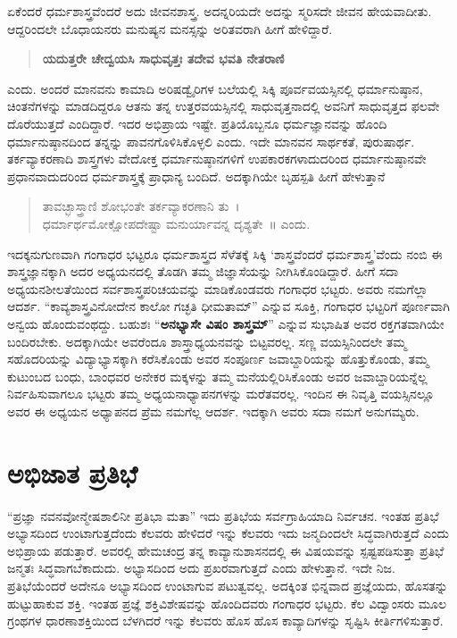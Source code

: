 {ಏಕೆಂದರೆ ಧರ್ಮಶಾಸ್ತ್ರವೆಂದರೆ ಅದು ಜೀವನಶಾಸ್ತ್ರ. ಅದನ್ನರಿಯದೇ ಅದನ್ನು ಸ್ಮರಿಸದೇ ಜೀವನ ಹೇಯವಾದೀತು. ಆದ್ದರಿಂದಲೇ ಬೊಧಾಯನರು ಮನುಷ್ಯನ ಮನಸ್ಸನ್ನು ಅರಿತವರಾಗಿ ಹೀಗೆ ಹೇಳಿದ್ದಾರೆ.
\begin{verse}
\textbf{ಯದುತ್ತರೇ ಚೇದ್ವಯಸಿ ಸಾಧುವೃತ್ತಃ ತದೇವ ಭವತಿ ನೇತರಾಣಿ}
\end{verse}
 ಎಂದು. ಅಂದರೆ ಮಾನವನು ಕಾಮಾದಿ ಅರಿಷಡ್ವೈರಿಗಳ ಬಲೆಯಲ್ಲಿ ಸಿಕ್ಕಿ ಪೂರ್ವ\-ವಯಸ್ಸಿ\-ನಲ್ಲಿ ಧರ್ಮಾನುಷ್ಠಾನ, ಚಿಂತನೆಗಳನ್ನು ಮಾಡದಿದ್ದರೂ ಆತನು ತನ್ನ ಉತ್ತರ\-ವಯಸ್ಸಿನಲ್ಲಿ ಸಾಧುವೃತ್ತನಾದಲ್ಲಿ ಅವನಿಗೆ ಸಾಧುವೃತ್ತದ ಫಲವೇ ದೊರೆಯುತ್ತದೆ ಎಂದಿದ್ದಾರೆ. ಇದರ ಅಭಿಪ್ರಾಯ ಇಷ್ಟೇ. ಪ್ರತಿಯೊಬ್ಬನೂ ಧರ್ಮಜ್ಞಾನವನ್ನು ಹೊಂದಿ ಧರ್ಮಾನುಷ್ಠಾನದಿಂದ ತನ್ನನ್ನು ಪಾವನಗೊಳಿಸಿಕೊಳ್ಳಲಿ ಎಂದು. ಇದೇ ಮಾನವನ ಸಾರ್ಥಕತೆ, ಪುರುಷಾರ್ಥ. ತರ್ಕವ್ಯಾಕರಣಾದಿ ಶಾಸ್ತ್ರಗಳು ವೇದೋಕ್ತ ಧರ್ಮಾನುಷ್ಠಾನಗಳಿಗೆ ಉಪಕಾರಕಗಳಾದುದರಿಂದ ಧರ್ಮಾನುಷ್ಠಾನವೇ ಪ್ರಧಾನವಾದುದರಿಂದ ಧರ್ಮಶಾಸ್ತ್ರಕ್ಕೆ ಪ್ರಾಧಾನ್ಯ ಬಂದಿದೆ. ಅದಕ್ಕಾಗಿಯೇ ಬೃಹಸ್ಪತಿ ಹೀಗೆ ಹೇಳುತ್ತಾನೆ  \enginline{-}  
\begin{verse}
ತಾವಚ್ಛಾಸ್ತ್ರಾಣಿ ಶೋಭಂತೇ ತರ್ಕವ್ಯಾಕರಣಾನಿ ತು~।\\
ಧರ್ಮಾರ್ಥಮೋಕ್ಷೋಪದೇಷ್ಟಾ ಮನುರ್ಯಾವನ್ನ ದೃಶ್ಯತೇ~॥ ಎಂದು.
\end{verse}
ಇದಕ್ಕನುಗುಣವಾಗಿ ಗಂಗಾಧರ ಭಟ್ಟರೂ ಧರ್ಮಶಾಸ್ತ್ರದ ಸೆಳೆತಕ್ಕೆ ಸಿಕ್ಕಿ ‘ಶಾಸ್ತ್ರವೆಂದರೆ ಧರ್ಮಶಾಸ್ತ್ರ’ವೆಂದು ನಂಬಿ ಈ ಶಾಸ್ತ್ರಜ್ಞಾನಕ್ಕಾಗಿ ಅದರ ಅಧ್ಯಯನದಲ್ಲಿ ತೊಡಗಿ ತಮ್ಮ ಜಿಜ್ಞಾಸೆಯನ್ನು ನೀಗಿಸಿಕೊಂಡಿದ್ದಾರೆ. ಹೀಗೆ ಸದಾ ಅಧ್ಯಯನಶೀಲತೆಯಿಂದ ಸರ್ವಶಾಸ್ತ್ರಪರಿಚಯವನ್ನು ಮಾಡಿಕೊಂಡವರು ಗಂಗಾಧರ ಭಟ್ಟರು. ಅವರು ನಮಗೆಲ್ಲಾ ಆದರ್ಶ. “ಕಾವ್ಯಶಾಸ್ತ್ರವಿನೋದೇನ ಕಾಲೋ ಗಚ್ಛತಿ ಧೀಮತಾಮ್” ಎನ್ನುವ ಸೂಕ್ತಿ, ಗಂಗಾಧರ ಭಟ್ಟರಿಗೆ ಪೂರ್ಣವಾಗಿ ಅನ್ವಯ ಹೊಂದುವಂಥದ್ದು. ಬಹುಶಃ “\textbf{ಅನಭ್ಯಾಸೇ ವಿಷಂ ಶಾಸ್ತ್ರಮ್}” ಎನ್ನುವ ಸುಭಾಷಿತ ಅವರ ರಕ್ತಗತವಾಗಿಯೇ ಬಂದಿರಬೇಕು. ಅದಕ್ಕಾಗಿಯೇ ಅವರೆಂದೂ ಶಾಸ್ತ್ರಾಧ್ಯಯನವನ್ನು ಬಿಟ್ಟವರಲ್ಲ. ಸಣ್ಣ ವಯಸ್ಸಿನಿಂದಲೇ ತಮ್ಮ ಸಹೊದರಿಯನ್ನು ವಿದ್ಯಾಭ್ಯಾಸಕ್ಕಾಗಿ ಕರೆಸಿಕೊಂಡು ಅವರ ಸಂಪೂರ್ಣ ಜವಾಬ್ದಾರಿಯನ್ನು ಹೊತ್ತುಕೊಂಡು, ತಮ್ಮ ಕುಟುಂಬದ ಬಂಧು, ಬಾಂಧವರ ಅನೇಕರ ಮಕ್ಕಳನ್ನು ತಮ್ಮ ಮನೆಯಲ್ಲಿರಿಸಿಕೊಂಡು ಅವರ ಜವಾಬ್ದಾರಿಯನ್ನೆಲ್ಲ ನಿರ್ವಹಿಸುವಾಗಲೂ ಭಟ್ಟರು ತಮ್ಮ ಅಧ್ಯಯನಾಧ್ಯಾಪನಗಳನ್ನು ಮರೆತವರಲ್ಲ. ಇಂದಿನ ಈ ನಿವೃತ್ತಿ ವಯಸ್ಸಿ\-ನಲ್ಲೂ ಅವರ ಈ ಅಧ್ಯಯನ ಅಧ್ಯಾಪನದ ಪ್ರೆಮ ನಮಗೆಲ್ಲ ಆದರ್ಶ. ಇದಕ್ಕಾಗಿ ಅವರು ಸದಾ ನಮಗೆ ಅನುಗಮ್ಯರು.

\section*{ಅಭಿಜಾತ ಪ್ರತಿಭೆ}  

“ಪ್ರಜ್ಞಾ ನವನವೋನ್ಮೇಷಶಾಲಿನೀ ಪ್ರತಿಭಾ ಮತಾ” ಇದು ಪ್ರತಿಭೆಯ ಸರ್ವಗ್ರಾಹಿಯಾದಿ ನಿರ್ವಚನ. ಇಂತಹ ಪ್ರತಿಭೆ ಅಭ್ಯಾಸದಿಂದ ಉಂಟಾಗುತ್ತದೆಂದು ಕೆಲವರು ಹೇಳಿದರೆ ಇನ್ನು ಕೆಲವರು ಇದು ಜನ್ಮದಿಂದಲೇ ಸಿದ್ಧವಾಗಿರುತ್ತದೆ ಎಂದು ಅಭಿಪ್ರಾಯ ಪಡುತ್ತಾರೆ. ಅವರಲ್ಲಿ ಹೇಮಚಂದ್ರ ತನ್ನ ಕಾವ್ಯಾನುಶಾಸನದಲ್ಲಿ ಈ ವಿಷಯವನ್ನು ಸ್ಪಷ್ಟಪಡಿಸುತ್ತಾ ಪ್ರತಿಭೆ ಜನ್ಮತಃ ಸಿದ್ಧವಾಗಬೆಕಾದುದು. ಅಭ್ಯಾಸದಿಂದ ಅದು ಪ್ರಖರ\-ವಾಗುತ್ತದೆ ಎಂದು ಹೇಳುತ್ತಾನೆ. ಇದೇ ನಿಜ. ಪ್ರತಿಭೆಯೆಂದರೆ ಅದೇನೂ ಅಭ್ಯಾಸದಿಂದ ಉಂಟಾಗುವ ಪಟುತ್ವವಲ್ಲ. ಅದಕ್ಕಿಂತ ಭಿನ್ನವಾದ ಪ್ರಜ್ಞೆಯದು, ಹೊಸತನ್ನು ಹುಟ್ಟು\-ಹಾಕುವ ಶಕ್ತಿ. ಇಂತಹ ಪ್ರಜ್ಞೆ ಶಕ್ತಿವಿಶೇಷವನ್ನು ಹೊಂದಿದವರು ಗಂಗಾಧರ ಭಟ್ಟರು. ಕೆಲ ವಿದ್ವಾಂಸರು ಮೂಲ ಗ್ರಂಥಗಳ ಧಾರಣಾಶಕ್ತಿಯಿಂದ ಬೆಳಗಿದರೆ ಇನ್ನು ಕೆಲವರು ಹೊಸ ಹೊಸ ಕಾವ್ಯಾದಿಗಳನ್ನು ಸೃಷ್ಟಿಸಿ ಕೀರ್ತಿಗಳಿಸುತ್ತಾರೆ. 

}
